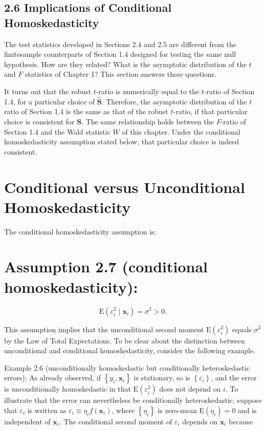 \documentclass[10pt]{article}
\begin{document}
\subsection*{2.6 Implications of Conditional Homoskedasticity}
The test statistics developed in Sections 2.4 and 2.5 are different from the finitesample counterparts of Section 1.4 designed for testing the same null hypothesis. How are they related? What is the asymptotic distribution of the $t$ and $F$ statistics of Chapter 1? This section answers these questions.

It turns out that the robust $t$-ratio is numerically equal to the $t$-ratio of Section 1.4, for a particular choice of $\widehat{\mathbf{S}}$. Therefore, the asymptotic distribution of the $t$ ratio of Section 1.4 is the same as that of the robust $t$-ratio, if that particular choice is consistent for $\mathbf{S}$. The same relationship holds between the $F$-ratio of Section 1.4 and the Wald statistic $W$ of this chapter. Under the conditional homoskedasticity assumption stated below, that particular choice is indeed consistent.

\section*{Conditional versus Unconditional Homoskedasticity}
The conditional homoskedasticity assumption is:

\section*{Assumption 2.7 (conditional homoskedasticity):}

\begin{equation*}
\mathrm{E}\left(\varepsilon_{i}^{2} \mid \mathbf{x}_{i}\right)=\sigma^{2}>0 . \tag{2.6.1}
\end{equation*}


This assumption implies that the unconditional second moment $\mathrm{E}\left(\varepsilon_{i}^{2}\right)$ equals $\sigma^{2}$ by the Law of Total Expectations. To be clear about the distinction between unconditional and conditional homoskedasticity, consider the following example.

Example 2.6 (unconditionally homoskedastic but conditionally heteroskedastic errors): As already observed, if $\left\{y_{i}, \mathbf{x}_{i}\right\}$ is stationary, so is $\left\{\varepsilon_{i}\right\}$, and the error is unconditionally homoskedastic in that $\mathrm{E}\left(\varepsilon_{i}^{2}\right)$ does not depend on $i$. To illustrate that the error can nevertheless be conditionally heteroskedastic, suppose that $\varepsilon_{i}$ is written as $\varepsilon_{i} \equiv \eta_{i} f\left(\mathbf{x}_{i}\right)$, where $\left\{\eta_{i}\right\}$ is zero-mean $\mathrm{E}\left(\eta_{i}\right)=0$ and is independent of $\mathbf{x}_{i}$. The conditional second moment of $\varepsilon_{i}$ depends on $\mathbf{x}_{i}$ because
\end{document}
